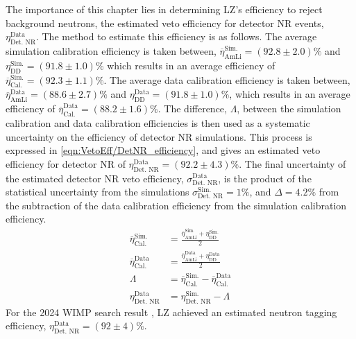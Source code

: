 The importance of this chapter lies in determining LZ's efficiency to reject background neutrons, the estimated veto efficiency for detector NR events, $\eta_{\text{Det. NR}}^{\text{Data}}$. The method to estimate this efficiency is as follows. 
The average simulation calibration efficiency is taken between, $\overline{\eta}_{\text{AmLi}}^{\text{Sim.}}=(92.8\pm2.0)\%$ and $\eta_{\text{DD}}^{\text{Sim.}}=(91.8\pm1.0)\%$ which results in an average efficiency of $\overline{\eta}_{\text{Cal.}}^{\text{Sim.}}=(92.3\pm1.1)\%$.
The average data calibration efficiency is taken between, $\overline{\eta}_{\text{AmLi}}^{\text{Data}}=(88.6\pm2.7)\%$ and $\eta_{\text{DD}}^{\text{Data}}=(91.8\pm1.0)\%$, which results in an average efficiency of $\overline{\eta}_{\text{Cal.}}^{\text{Data}}=(88.2\pm1.6)\%$.
The difference, $\Lambda$, between the simulation calibration and data calibration efficiencies is then used as a systematic uncertainty on the efficiency of detector NR simulations.
This process is expressed in \autoref{eqn:VetoEff/DetNR_efficiency}, and gives an estimated veto efficiency for detector NR of $\eta_{\text{Det. NR}}^\text{Data}=(92.2\pm4.3)\%$.
The final uncertainty of the estimated detector NR veto efficiency, $\sigma^\text{Data}_\text{Det. NR}$, is the product of the statistical uncertainty from the simulations $\sigma^\text{Sim.}_\text{Det. NR}=1\%$, and $\Delta=4.2\%$ from the subtraction of the data calibration efficiency from the simulation calibration efficiency.
\begin{equation}
    \label{eqn:VetoEff/DetNR_efficiency}
    \begin{split}
    	\overline{\eta}_{\text{Cal.}}^{\text{Sim.}} & = \frac{\overline{\eta}_{\text{AmLi}}^{\text{Sim.}}+\eta_{\text{DD}}^{\text{Sim.}}}{2}\\
    	\overline{\eta}_{\text{Cal.}}^{\text{Data}} & = \frac{\overline{\eta}_{\text{AmLi}}^{\text{Data}}+\eta_{\text{DD}}^{\text{Data}}}{2} \\
    	\Lambda &= \overline{\eta}_{\text{Cal.}}^{\text{Sim.}} - \overline{\eta}_{\text{Cal.}}^{\text{Data}}\\
    	\eta_\text{Det. NR}^\text{Data}   & = \eta_\text{Det. NR}^\text{Sim.} - \Lambda
    \end{split}
\end{equation}
For the 2024 WIMP search result \cite{LZ:2024zvo}, LZ achieved an estimated neutron tagging efficiency, $\eta_\text{Det. NR}^\text{Data}=(92\pm4)\%$.


